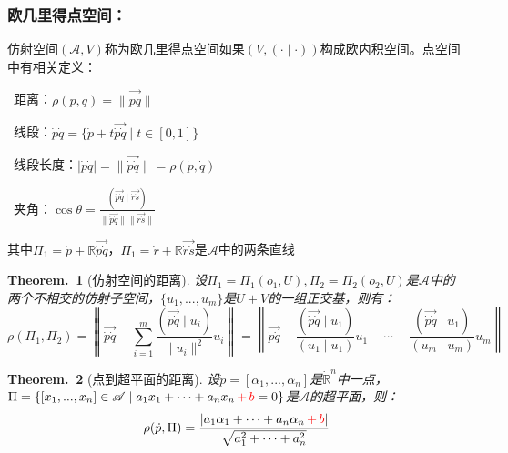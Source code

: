 \documentclass[zihao=-4,UTF8]{report}
\def\R{\mathbb{R}}
\def\A{\mathscr{A}}
\theoremstyle{mystyle} %
\newtheorem{theorem}{Theorem.\,}
\begin{document}
\subsubsection{欧几里得点空间：}
仿射空间$(\A,V)$称为欧几里得点空间如果$(V,(\cdot\mid\cdot))$构成欧内积空间。点空间中有相关定义：
\par{}\ 距离：$\rho(\dot{p}, \dot{q}) = \|\overrightarrow{\dot{p}\dot{q}}\|$    \par
{}\  线段：$\dot{p}\dot{q} = \{\dot{p} + t\overrightarrow{\dot{p}\dot{q}}\mid t \in [0,1]\}$   \par
{}\  线段长度：$|\dot{p}\dot{q}| =\|\overrightarrow{\dot{p}\dot{q}}\|= \rho(\dot{p}, \dot{q}) $   \par
{}\ 夹角：$\cos \theta = \frac{(\overrightarrow{\dot{p}\dot{q}}\mid \overrightarrow{\dot{r}\dot{s}})}{\| \overrightarrow{\dot{p}\dot{q}} \| \| \overrightarrow{\dot{r}\dot{s}} \|}$
{\par\color{gray}\small
其中$\Pi_1 = \dot{p} + \R\overrightarrow{\dot{p}\dot{q}}$，$\Pi_1 = \dot{r} + \R\overrightarrow{\dot{r}\dot{s}}$是$\A$中的两条直线
\par}

\begin{theorem}[仿射空间的距离]\label{仿射空间的距离}
设$\Pi_1 = \Pi_1(\dot{o}_1,U), \Pi_2 = \Pi_2(\dot{o}_2,U)$是$\A$中的两个不相交的仿射子空间，$\{u_1,...,u_m\}$是$U+V$的一组正交基，则有：
\begin{equation*}
    \rho(\Pi_1,\Pi_2)= \left \|  \overrightarrow{\dot{p}\dot{q}} - \sum_{i=1}^{m}\frac{(\overrightarrow{\dot{p}\dot{q}}\mid u_i)}{\| u_i \|^2}u_i  \right \|=\left \| \overrightarrow{\dot{p}\dot{q}} - \frac{(\overrightarrow{\dot{p}\dot{q}}\mid u_1)}{(u_1\mid u_1)}u_1 - \cdots -   \frac{(\overrightarrow{\dot{p}\dot{q}}\mid u_1)}{(u_m\mid u_m)}u_m \right \|
\end{equation*}
\end{theorem}

\begin{theorem}[点到超平面的距离]\label{点到超平面的距离}
设$\dot{p} = [\alpha_1,...,\alpha_n]$是$\dot{\R}^n$中一点，$\Pi = \{[x_1,...,x_n]\in \A \mid a_1x_1 + \cdots + a_nx_n \textcolor{red}{\,+\,b} = 0 \}$是$\A$的超平面，则：
\begin{equation*}
    \rho(\dot{p},\Pi) = \frac{\left| a_1\alpha_1 + \cdots +a_n\alpha_n \textcolor{red}{\,+\,b}\right| }{\sqrt{a_1^2+\cdots+a_n^2}}
\end{equation*}
\end{theorem}
\end{document}
